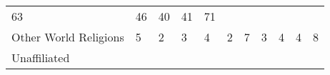\documentclass[]{article}
\begin{document}
\begin{longtable}[]{@{}lllllllllll@{}}
\begin{minipage}[t]{0.05\columnwidth}
63\strut
\end{minipage} & \begin{minipage}[t]{0.06\columnwidth}\raggedright
46\strut
\end{minipage} & \begin{minipage}[t]{0.06\columnwidth}\raggedright
40\strut
\end{minipage} & \begin{minipage}[t]{0.04\columnwidth}\raggedright
41\strut
\end{minipage} & \begin{minipage}[t]{0.11\columnwidth}\raggedright
71\strut
\end{minipage}\tabularnewline
\begin{minipage}[t]{0.14\columnwidth}\raggedright
Other World Religions\strut
\end{minipage} & \begin{minipage}[t]{0.04\columnwidth}\raggedright
5\strut
\end{minipage} & \begin{minipage}[t]{0.05\columnwidth}\raggedright
2\strut
\end{minipage} & \begin{minipage}[t]{0.05\columnwidth}\raggedright
3\strut
\end{minipage} & \begin{minipage}[t]{0.05\columnwidth}\raggedright
4\strut
\end{minipage} & \begin{minipage}[t]{0.05\columnwidth}\raggedright
2\strut
\end{minipage} & \begin{minipage}[t]{0.05\columnwidth}\raggedright
7\strut
\end{minipage} & \begin{minipage}[t]{0.06\columnwidth}\raggedright
3\strut
\end{minipage} & \begin{minipage}[t]{0.06\columnwidth}\raggedright
4\strut
\end{minipage} & \begin{minipage}[t]{0.04\columnwidth}\raggedright
4\strut
\end{minipage} & \begin{minipage}[t]{0.11\columnwidth}\raggedright
8\strut
\end{minipage}\tabularnewline
\begin{minipage}[t]{0.14\columnwidth}\raggedright
Unaffiliated\strut
\end{minipage} & \begin{minipage}[t]{0.04\columnwidth}\raggedright

\end{minipage}
\end{longtable}
\end{document}
